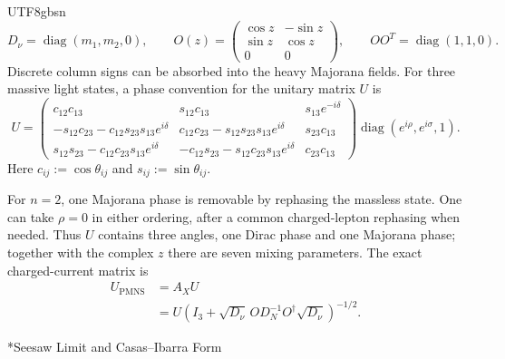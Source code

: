 \documentclass[11pt,a4paper,oneside]{report}
\makeatletter
\newcommand\topic{\@startsection{paragraph}{4}{\z@}{-1.7ex plus -.3ex}{.5ex}{\normalfont\normalsize\bfseries\itshape\boldmath}*}
\makeatother
\begin{document}
\begin{CJK*}{UTF8}{gbsn}
\begin{equation*}
D_\nu=\operatorname{diag}(m_1,m_2,0),\qquad
O(z)=\begin{pmatrix}\cos z&-\sin z\\\sin z&\cos z\\0&0\end{pmatrix},\qquad
OO^T=\operatorname{diag}(1,1,0).
\tag{6.32}\label{eq:6.32}
\end{equation*}
Discrete column signs can be absorbed into the heavy Majorana fields. For three massive light states, a phase convention for the unitary matrix $U$ is
\begin{equation*}
{\displaystyle 
U=\begin{pmatrix}
c_{12}c_{13}&s_{12}c_{13}&s_{13}e^{-i\delta}\\
-s_{12}c_{23}-c_{12}s_{23}s_{13}e^{i\delta}
&c_{12}c_{23}-s_{12}s_{23}s_{13}e^{i\delta}&s_{23}c_{13}\\
s_{12}s_{23}-c_{12}c_{23}s_{13}e^{i\delta}
&-c_{12}s_{23}-s_{12}c_{23}s_{13}e^{i\delta}&c_{23}c_{13}
\end{pmatrix}
\operatorname{diag}(e^{i\rho},e^{i\sigma},1)
}.
\tag{6.33}\label{eq:6.33}
\end{equation*}
Here $c_{ij}:=\cos\theta_{ij}$ and $s_{ij}:=\sin\theta_{ij}$.

For $n=2$, one Majorana phase is removable by rephasing the massless state. One can take $\rho=0$ in either ordering, after a common charged-lepton rephasing when needed. Thus $U$ contains three angles, one Dirac phase and one Majorana phase; together with the complex $z$ there are seven mixing parameters. The exact charged-current matrix is
\begin{equation*}
{\displaystyle 
\begin{aligned}
U_{\mathrm{PMNS}}&=A_XU\\
&=U\left(I_3+\sqrt{D_\nu}\,OD_N^{-1}O^\dagger\sqrt{D_\nu}\right)^{-1/2}.
\end{aligned}
}
\tag{6.34}\label{eq:6.34}
\end{equation*}

\topic{Seesaw Limit and Casas–Ibarra Form}


\end{CJK*}
\end{document}
